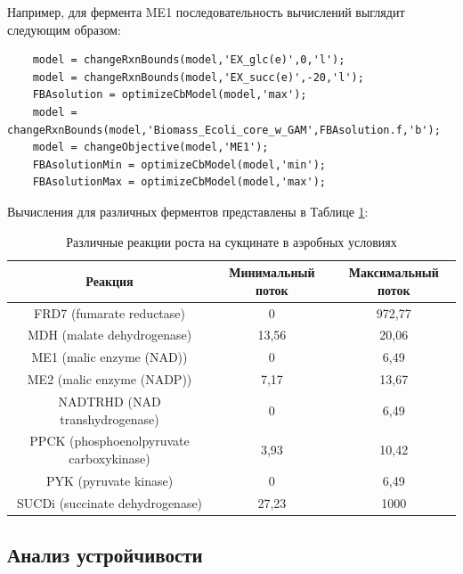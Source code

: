 \documentclass[a4paper, 12pt]{article}
\begin{document}
Например, для фермента ME1 последовательность вычислений выглядит следующим образом:

\begin{lstlisting}
    model = changeRxnBounds(model,'EX_glc(e)',0,'l');
    model = changeRxnBounds(model,'EX_succ(e)',-20,'l');
    FBAsolution = optimizeCbModel(model,'max');
    model = changeRxnBounds(model,'Biomass_Ecoli_core_w_GAM',FBAsolution.f,'b');
    model = changeObjective(model,'ME1');
    FBAsolutionMin = optimizeCbModel(model,'min');
    FBAsolutionMax = optimizeCbModel(model,'max');
\end{lstlisting}

Вычисления для различных ферментов представлены в Таблице \ref{t:2}:
\begin{table}[H]
\begin{tabular}{|c|c|c|}
\hline
Реакция                                  & Минимальный поток & Максимальный поток \\ \hline
FRD7 (fumarate reductase)                & 0                 & 972,77             \\ \hline
MDH (malate dehydrogenase)               & 13,56             & 20,06              \\ \hline
ME1 (malic enzyme (NAD))                 & 0                 & 6,49               \\ \hline
ME2 (malic enzyme (NADP))                & 7,17              & 13,67              \\ \hline
NADTRHD (NAD transhydrogenase)           & 0                 & 6,49               \\ \hline
PPCK (phosphoenolpyruvate carboxykinase) & 3,93              & 10,42              \\ \hline
PYK (pyruvate kinase)                    & 0                 & 6,49               \\ \hline
SUCDi (succinate dehydrogenase)          & 27,23             & 1000               \\ \hline
\end{tabular}
\caption{Различные реакции роста на сукцинате в аэробных условиях}
\label{t:2}
\end{table}

\subsection{Анализ устройчивости}
\end{document}
